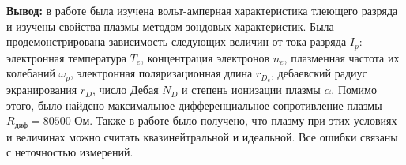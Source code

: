 \documentclass[a4paper,12pt]{article} %
\begin{document}
\newpage

\textbf{Вывод:} в работе была изучена вольт-амперная характеристика тлеющего разряда и изучены свойства плазмы методом зондовых характеристик. Была продемонстрирована зависимость следующих величин от тока разряда $I_p$: электронная температура $T_e$, концентрация электронов $n_e$, плазменная частота их колебаний $\omega_p$, электронная поляризационная длина $r_{D_e}$, дебаевский радиус экранирования $r_D$, число Дебая $N_D$ и степень ионизации плазмы $\alpha$. Помимо этого, было найдено максимальное дифференциальное сопротивление плазмы $R_{\text{диф}} = 80500$ Ом. Также в работе было получено, что плазму при этих условиях и величинах можно считать квазинейтральной и идеальной. Все ошибки связаны с неточностью измерений.
\end{document}
